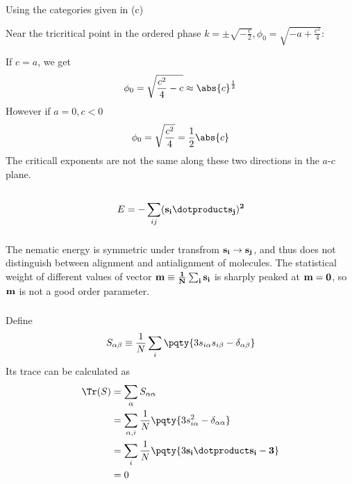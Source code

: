 \documentclass[12pt]{article}
\begin{document}
        \subsubsection{} 
        Using the categories given in (c)
        \begin{center}
            \def\svgwidth{300pt}
        \end{center}
        Near the tricritical point in the ordered phase \(k = \pm \sqrt{ - \frac{c}{2}}, \phi_0 = \sqrt{ - a + \frac{c^2}{4}}\):
        
        If \(c = a\), we get \[
            \phi_0 = \sqrt{\frac{c^2}{4} - c} \approx \abs{c}^\frac{1}{2} 
        \]
        However if \(a = 0, c < 0\) \[
            \phi_0 = \sqrt{\frac{c^2}{4}} = \frac{1}{2} \abs{c}
        \]
        The criticall exponents are not the same along these two directions in the \(a\)-\(c\) plane.
        \subsection{} \[
            E = -\sum_{ij}(\bf s_i \dotproduct \bf s_j)^2
        \]
        \subsubsection{} The nematic energy is symmetric under transfrom \(\bf s_i \to \bf s_j\), and thus does not distinguish between alignment and antialignment of molecules. The statistical weight of different values of vector \(\bf m \equiv \frac{1}{N}\sum_i \bf s_i\) is sharply peaked at \(\bf m = 0\), so \(\bf m\) is not a good order parameter.
        \subsubsection{} Define \[
            S_{\alpha\beta} \equiv \frac{1}{N} \sum_i \pqty{3s_{i\alpha}s_{i\beta} - \delta_{\alpha\beta}}
        \]
        Its trace can be calculated as \begin{align*}
            \Tr(S) &= \sum_{\alpha} S_{\alpha\alpha}\\
            &= \sum_{\alpha,i}\frac{1}{N} \pqty{3s_{i\alpha}^2 - \delta_{\alpha\alpha}}\\
            &= \sum_i \frac{1}{N} \pqty{3 \bf s_i \dotproduct \bf s_i - 3}\\
            &= 0
        \end{align*}
\end{document}
